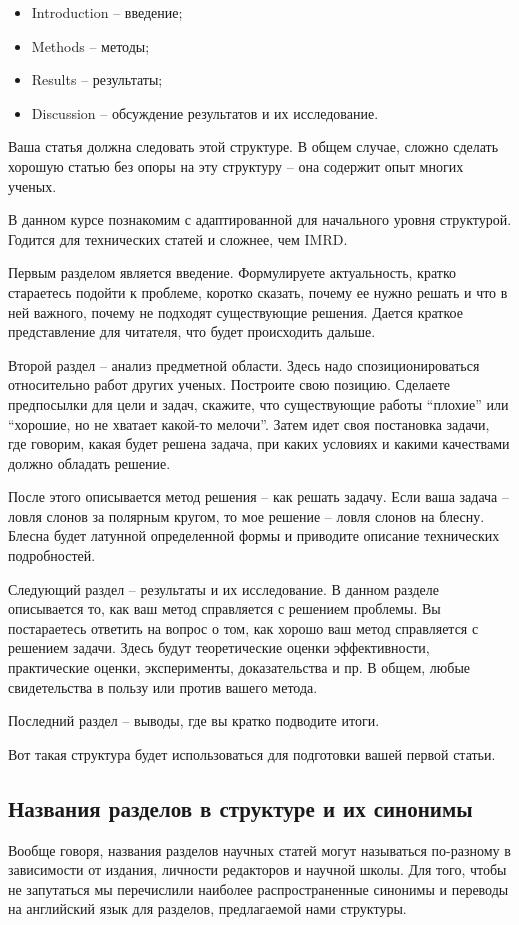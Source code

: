 \documentclass{report}
\begin{document}
\begin{itemize}
	\item Introduction – введение;
	\item Methods – методы;
	\item Results – результаты;
	\item Discussion – обсуждение результатов и их исследование.
\end{itemize}

Ваша статья должна следовать этой структуре. В общем случае, сложно сделать хорошую статью без опоры на эту структуру – она содержит опыт многих ученых.

В данном курсе познакомим с адаптированной для начального уровня структурой. Годится для технических статей и сложнее, чем IMRD.

Первым разделом является введение. Формулируете актуальность, кратко стараетесь подойти к проблеме, коротко сказать, почему ее нужно решать и что в ней важного, почему не подходят существующие решения. Дается краткое представление для читателя, что будет происходить дальше.

Второй раздел – анализ предметной области. Здесь надо спозиционироваться относительно работ других ученых. Построите свою позицию. Сделаете предпосылки для цели и задач, скажите, что существующие работы “плохие” или “хорошие, но не хватает какой-то мелочи”. Затем идет своя постановка задачи, где говорим, какая будет решена задача, при каких условиях и какими качествами должно обладать решение.

После этого описывается метод решения – как решать задачу. Если ваша задача – ловля слонов за полярным кругом, то мое решение – ловля слонов на блесну. Блесна будет латунной определенной формы и приводите описание технических подробностей.

Следующий раздел – результаты и их исследование. В данном разделе описывается то, как ваш метод справляется с решением проблемы. Вы постараетесь ответить на вопрос о том, как хорошо ваш метод справляется с решением задачи. Здесь будут теоретические оценки эффективности, практические оценки, эксперименты, доказательства и пр. В общем, любые свидетельства в пользу или против вашего метода.

Последний раздел – выводы, где вы кратко подводите итоги.

Вот такая структура будет использоваться для подготовки вашей первой статьи.

\subsection{Названия разделов в структуре и их синонимы}
Вообще говоря, названия разделов научных статей могут называться по-разному в зависимости от издания, личности редакторов и научной школы. Для того, чтобы не запутаться мы перечислили наиболее распространенные синонимы и переводы на английский язык для разделов, предлагаемой нами структуры.
\end{document}
